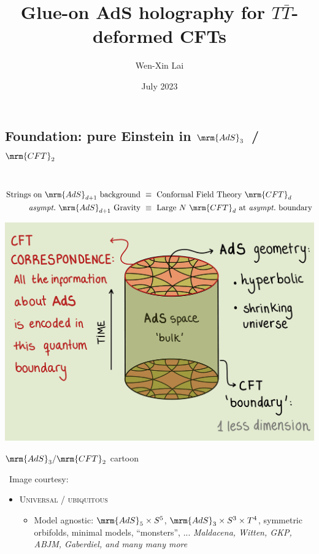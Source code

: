 \documentclass[11pt]{article}
\title{Glue-on AdS holography for $T\bar T$-deformed CFTs}
\author{Wen-Xin Lai \textkai{赖文昕}}
\date{July 2023}
\begin{document}
\maketitle
\thispagestyle{empty}


\begin{multicols}{3}

\section*{Foundation: pure Einstein in $\mrm{AdS}_3$~/~$\mrm{CFT}_2$}

\textcite{Maldacena:1997re}\\
\textcite{Aharony:1999ti}
\begin{align*}
	\textrm{Strings on $\mrm{AdS}_{d+1}$ background}
	&\ \equiv\ 
	\textrm{Conformal Field Theory $\mrm{CFT}_{d}$}
\\
	\textrm{\textit{asympt.}~$\mrm{AdS}_{d+1}$ Gravity}
	&\ \equiv\ 
	\textrm{Large $N$ $\mrm{CFT}_{d}$ at \textit{asympt.}~boundary}
\end{align*}
\begin{center}
	\includegraphics[width=.6\linewidth]{img/ads-cft.png}

	\vspace{-.2\baselineskip}
	\captionsetup{type=figure}
	\caption{$\mrm{AdS}_3/\mrm{CFT}_2$ cartoon}
	
	\vspace{.1\baselineskip}
	\scriptsize\ Image courtesy: \textcite{AldegundePWSep22}
\end{center}

\begin{itemize}

\item \textsc{Universal / ubiquitous}

\begin{itemize}
	\item Model agnostic: $\mrm{AdS}_5\times S^5$, $\mrm{AdS}_3\times S^3 \times T^4$, symmetric orbifolds, minimal models, ``monsters'', ... \textit{\small Maldacena, Witten, GKP, ABJM, Gaberdiel, and many many more}
	

\end{itemize}
\end{itemize}
\end{multicols}
\end{document}
